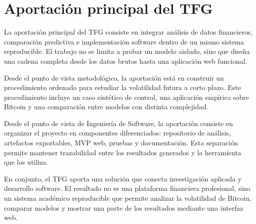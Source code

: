 \section{Aportación principal del TFG}\label{sec:aportacion-principal}

La aportación principal del TFG consiste en integrar análisis de datos financieros, comparación predictiva e implementación software dentro de un mismo sistema reproducible. El trabajo no se limita a probar un modelo aislado, sino que diseña una cadena completa desde los datos brutos hasta una aplicación web funcional.

Desde el punto de vista metodológico, la aportación está en construir un procedimiento ordenado para estudiar la volatilidad futura a corto plazo. Este procedimiento incluye un caso sintético de control, una aplicación empírica sobre Bitcoin y una comparación entre modelos con distinta complejidad.

Desde el punto de vista de Ingeniería de Software, la aportación consiste en organizar el proyecto en componentes diferenciados: repositorio de análisis, artefactos exportables, MVP web, pruebas y documentación. Esta separación permite mantener trazabilidad entre los resultados generados y la herramienta que los utiliza.

En conjunto, el TFG aporta una solución que conecta investigación aplicada y desarrollo software. El resultado no es una plataforma financiera profesional, sino un sistema académico reproducible que permite analizar la volatilidad de Bitcoin, comparar modelos y mostrar una parte de los resultados mediante una interfaz web.
